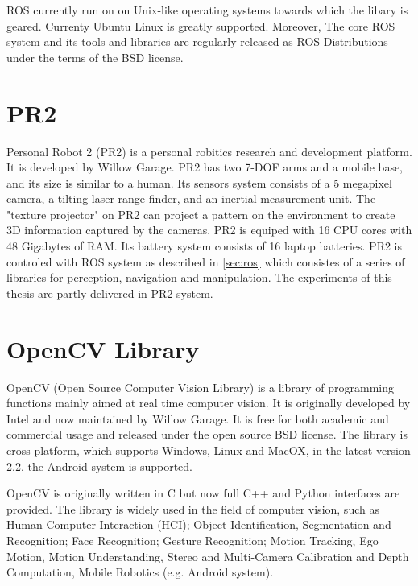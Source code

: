 ROS currently run on on Unix-like operating systems towards which the libary is
geared. Currenty Ubuntu Linux is greatly supported. Moreover, The core
ROS system and its tools and libraries are regularly released as ROS
Distributions\cite{rosintroduction} under the terms of the BSD license.

\section{PR2}
\label{sec:pr2}
Personal Robot 2 (PR2) is a personal robitics research and development
platform.  It is developed by Willow Garage.  PR2 has two 7-DOF arms and a mobile
base, and its size  is similar to a human. Its sensors system consists of a 5
megapixel camera, a tilting laser range finder, and an inertial
measurement unit. The "texture projector" on PR2 can project a pattern
on the environment to create 3D information captured by the
cameras. PR2 is equiped with 16 CPU cores with 48 Gigabytes of
RAM. Its battery system consists of 16 laptop batteries. PR2 is
controled with ROS system as described  in \ref{sec:ros} which
consistes of a series of libraries for perception, navigation and
manipulation.
The experiments of this thesis are partly delivered in PR2 system.

\section{OpenCV Library}
\label{sec:opencv}

OpenCV (Open Source Computer Vision Library) is a library of
programming functions mainly aimed at real time computer vision. It is
originally developed by Intel and now maintained by Willow Garage. It
is free for both academic and commercial usage and released  under the
open source BSD license. The library is cross-platform, which supports
Windows, Linux and MacOX,  in the latest version 2.2, the Android
system is supported.

OpenCV is originally written in C but now full C++ and Python
interfaces are provided. The library is widely used in the field of
computer vision, such as Human-Computer Interaction (HCI); Object
Identification, Segmentation and Recognition; Face Recognition;
Gesture Recognition; Motion Tracking, Ego Motion, Motion
Understanding, Stereo and Multi-Camera
Calibration and Depth Computation, Mobile Robotics (e.g. Android
system).

